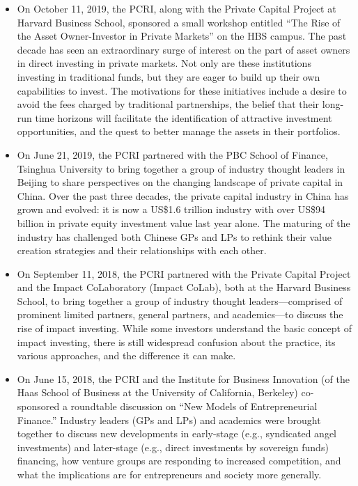 \documentclass[
]{book}
\begin{document}
\begin{itemize}
\item
  On October 11, 2019, the PCRI, along with the Private Capital Project at Harvard Business School, sponsored a small workshop entitled ``The Rise of the Asset Owner-Investor in Private Markets'' on the HBS campus. The past decade has seen an extraordinary surge of interest on the part of asset owners in direct investing in private markets. Not only are these institutions investing in traditional funds, but they are eager to build up their own capabilities to invest. The motivations for these initiatives include a desire to avoid the fees charged by traditional partnerships, the belief that their long-run time horizons will facilitate the identification of attractive investment opportunities, and the quest to better manage the assets in their portfolios.
\item
  On June 21, 2019, the PCRI partnered with the PBC School of Finance, Tsinghua University to bring together a group of industry thought leaders in Beijing to share perspectives on the changing landscape of private capital in China. Over the past three decades, the private capital industry in China has grown and evolved: it is now a US\$1.6 trillion industry with over US\$94 billion in private equity investment value last year alone. The maturing of the industry has challenged both Chinese GPs and LPs to rethink their value creation strategies and their relationships with each other.
\item
  On September 11, 2018, the PCRI partnered with the Private Capital Project and the Impact CoLaboratory (Impact CoLab), both at the Harvard Business School, to bring together a group of industry thought leaders---comprised of prominent limited partners, general partners, and academics---to discuss the rise of impact investing. While some investors understand the basic concept of impact investing, there is still widespread confusion about the practice, its various approaches, and the difference it can make.
\item
  On June 15, 2018, the PCRI and the Institute for Business Innovation (of the Haas School of Business at the University of California, Berkeley) co-sponsored a roundtable discussion on ``New Models of Entrepreneurial Finance.'' Industry leaders (GPs and LPs) and academics were brought together to discuss new developments in early-stage (e.g., syndicated angel investments) and later-stage (e.g., direct investments by sovereign funds) financing, how venture groups are responding to increased competition, and what the implications are for entrepreneurs and society more generally.
\end{itemize}
\end{document}
